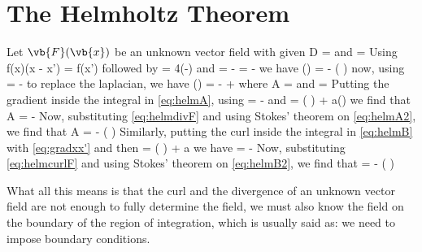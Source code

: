 \documentclass[oneside, 12pt]{book}
\begin{document}
\mainmatter \pagestyle{mypage2} \normalfont

\chapter{The Helmholtz Theorem} 

Let \(\vb{F}(\vb{x})\) be an unknown vector field with given 
\beq[eq:helmdivF] D = \eeq 
and
\beq[eq:helmcurlF]  = \eeq
Using 
\beq[eq:deltapick] \int {}f(x)\delta(x - x') = f(x')\eeq
followed by
\beq[eq:divdelta]  = 4\pi \delta(-)\eeq
and
\beq[eq:grad1r]  = - = -\eeq
we have
\beq[eq:helm1] () = - \int {} \left( \right) \eeq
now, using
\beq[eq:curlcurl]  =  - \eeq
to replace the laplacian, we have
\beq[eq:helm2] () = - +  \eeq
where
\beq[eq:helmA] A =  \eeq 
and
\beq[eq:helmB]  = \eeq
Putting the gradient inside the integral in \eqref{eq:helmA}, using
\beq[eq:gradxx']  = -\eeq
and
\beq[eq:divaV]  = \left( \right)\cdot{} + a\left(\right)\eeq
we find that
\beq[eq:helmA2] A = \int {} - \int {} \eeq
Now, substituting \eqref{eq:helmdivF} and using Stokes' theorem on \eqref{eq:helmA2}, we find that
\beq[eq:helmAfinal] A =    -  \cdot \left( \right)\eeq
Similarly, putting the curl inside the integral in \eqref{eq:helmB} with \eqref{eq:gradxx'} and then
\beq[eq:curlaV]  = \left( \right)\cross {} + a \eeq
we have
\beq[eq:helmB2]  =  \int {}  - \int {} \eeq
Now, substituting \eqref{eq:helmcurlF} and using Stokes' theorem on \eqref{eq:helmB2}, we find that
\beq[eq:helmBfinal]  =    -  \cross \left( \right) \eeq \par 
What all this means is that the curl and the divergence of an unknown vector field are not enough to fully determine the field, we must also know the field on the boundary of the region of integration, which is usually said as: we need to impose boundary conditions.\par
\end{document}
